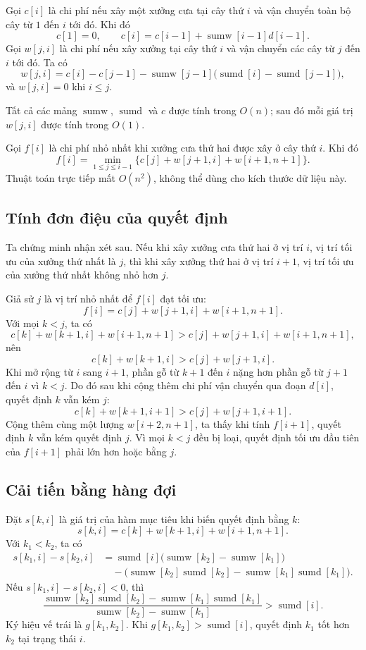 \documentclass[11pt]{article}
\begin{document}
Gọi $c[i]$ là chi phí nếu xây một xưởng cưa tại cây thứ $i$ và vận chuyển
toàn bộ cây từ $1$ đến $i$ tới đó. Khi đó
\[
  c[1]=0,\qquad
  c[i]=c[i-1]+\operatorname{sumw}[i-1]d[i-1].
\]
Gọi $w[j,i]$ là chi phí nếu xây xưởng tại cây thứ $i$ và vận chuyển các cây
từ $j$ đến $i$ tới đó. Ta có
\[
  w[j,i]
  =
  c[i]-c[j-1]
  -\operatorname{sumw}[j-1]\bigl(\operatorname{sumd}[i]
    -\operatorname{sumd}[j-1]\bigr),
\]
và $w[j,i]=0$ khi $i\le j$.

Tất cả các mảng $\operatorname{sumw}$, $\operatorname{sumd}$ và $c$ được tính
trong $O(n)$; sau đó mỗi giá trị $w[j,i]$ được tính trong $O(1)$.

Gọi $f[i]$ là chi phí nhỏ nhất khi xưởng cưa thứ hai được xây ở cây thứ $i$.
Khi đó
\[
  f[i]=
  \min_{1\le j\le i-1}
  \{c[j]+w[j+1,i]+w[i+1,n+1]\}.
\]
Thuật toán trực tiếp mất $O(n^2)$, không thể dùng cho kích thước dữ liệu này.

\subsection*{Tính đơn điệu của quyết định}

Ta chứng minh nhận xét sau. Nếu khi xây xưởng cưa thứ hai ở vị trí $i$, vị
trí tối ưu của xưởng thứ nhất là $j$, thì khi xây xưởng thứ hai ở vị trí
$i+1$, vị trí tối ưu của xưởng thứ nhất không nhỏ hơn $j$.

Giả sử $j$ là vị trí nhỏ nhất để $f[i]$ đạt tối ưu:
\[
  f[i]=c[j]+w[j+1,i]+w[i+1,n+1].
\]
Với mọi $k<j$, ta có
\[
  c[k]+w[k+1,i]+w[i+1,n+1]
  >
  c[j]+w[j+1,i]+w[i+1,n+1],
\]
nên
\[
  c[k]+w[k+1,i]>c[j]+w[j+1,i].
\]
Khi mở rộng từ $i$ sang $i+1$, phần gỗ từ $k+1$ đến $i$ nặng hơn phần gỗ từ
$j+1$ đến $i$ vì $k<j$. Do đó sau khi cộng thêm chi phí vận chuyển qua đoạn
$d[i]$, quyết định $k$ vẫn kém $j$:
\[
  c[k]+w[k+1,i+1]
  >
  c[j]+w[j+1,i+1].
\]
Cộng thêm cùng một lượng $w[i+2,n+1]$, ta thấy khi tính $f[i+1]$, quyết định
$k$ vẫn kém quyết định $j$. Vì mọi $k<j$ đều bị loại, quyết định tối ưu đầu
tiên của $f[i+1]$ phải lớn hơn hoặc bằng $j$.

\subsection*{Cải tiến bằng hàng đợi}

Đặt $s[k,i]$ là giá trị của hàm mục tiêu khi biến quyết định bằng $k$:
\[
  s[k,i]=c[k]+w[k+1,i]+w[i+1,n+1].
\]
Với $k_1<k_2$, ta có
\[
\begin{aligned}
  s[k_1,i]-s[k_2,i]
  &=
    \operatorname{sumd}[i]\bigl(\operatorname{sumw}[k_2]
      -\operatorname{sumw}[k_1]\bigr) \\
  &\quad-
    \bigl(\operatorname{sumw}[k_2]\operatorname{sumd}[k_2]
      -\operatorname{sumw}[k_1]\operatorname{sumd}[k_1]\bigr).
\end{aligned}
\]
Nếu $s[k_1,i]-s[k_2,i]<0$, thì
\[
  \frac{
    \operatorname{sumw}[k_2]\operatorname{sumd}[k_2]
    -\operatorname{sumw}[k_1]\operatorname{sumd}[k_1]}
  {\operatorname{sumw}[k_2]-\operatorname{sumw}[k_1]}
  >
  \operatorname{sumd}[i].
\]
Ký hiệu vế trái là $g[k_1,k_2]$. Khi
$g[k_1,k_2]>\operatorname{sumd}[i]$, quyết định $k_1$ tốt hơn $k_2$ tại
trạng thái $i$.
\end{document}
